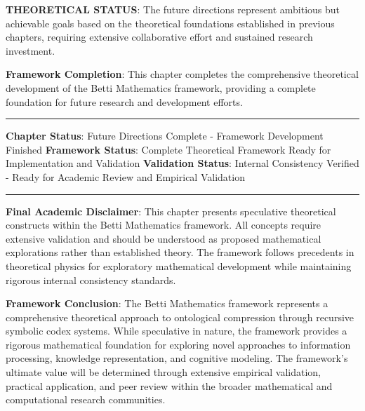 \textbf{THEORETICAL STATUS}: The future directions represent ambitious but achievable goals based on the theoretical foundations established in previous chapters, requiring extensive collaborative effort and sustained research investment.

\textbf{Framework Completion}: This chapter completes the comprehensive theoretical development of the Betti Mathematics framework, providing a complete foundation for future research and development efforts.

\hrule

\textbf{Chapter Status}: Future Directions Complete - Framework Development Finished  
\textbf{Framework Status}: Complete Theoretical Framework Ready for Implementation and Validation  
\textbf{Validation Status}: Internal Consistency Verified - Ready for Academic Review and Empirical Validation

\hrule

\textbf{Final Academic Disclaimer}: This chapter presents speculative theoretical constructs within the Betti Mathematics framework. All concepts require extensive validation and should be understood as proposed mathematical explorations rather than established theory. The framework follows precedents in theoretical physics for exploratory mathematical development while maintaining rigorous internal consistency standards.

\textbf{Framework Conclusion}: The Betti Mathematics framework represents a comprehensive theoretical approach to ontological compression through recursive symbolic codex systems. While speculative in nature, the framework provides a rigorous mathematical foundation for exploring novel approaches to information processing, knowledge representation, and cognitive modeling. The framework's ultimate value will be determined through extensive empirical validation, practical application, and peer review within the broader mathematical and computational research communities.